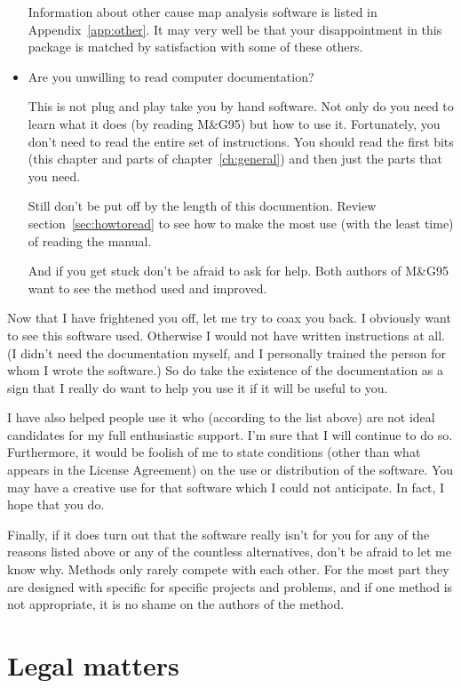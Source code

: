 \documentclass[%
	11pt,
        a4paper,
        twoside]{workrep}
\newcommand{\MG}{M\&G95\xspace}			%
\begin{document}
\begin{itemize}
  Information about other cause map analysis software is listed
  in Appendix~\ref{app:other}.  It may very well be that your
  disappointment in this package is matched by satisfaction with
  some of these others.

\item
  Are you unwilling to read computer documentation?

  This is not plug and play take you by hand software.  Not only do
  you need to learn what it does (by reading \MG) but how to use it.
  Fortunately, you don't need to read the entire set of instructions.
  You should read the first bits (this chapter and 
  parts of chapter~\ref{ch:general}) and then just the parts that you
  need.
 
  Still don't be put off by the length of this documention.
  Review section~\ref{sec:howtoread} to see how to make
  the most use (with the least time) of reading the manual.

  And if you get stuck don't be afraid to ask for help.  Both
  authors of \MG want to see the method used and improved.

\end{itemize}

Now that I have frightened you off, let me try to coax you back.
I obviously want to see this software used.  Otherwise I would not have
written instructions at all.  (I didn't need the documentation myself,
and I personally trained the person for whom I wrote the software.)
So do take the existence of the documentation as a sign that I
really do want to help you use it if it will be useful to you.

I have also helped people use it who (according to the list above)
are not ideal candidates for my full enthusiastic support.  I'm sure
that I will continue to do so.  Furthermore, it would be foolish of
me to state conditions (other than what appears in the License Agreement)
on the use or distribution of the software.  You may have a creative
use for that software which I could not anticipate.  In fact, I hope
that you do.

Finally, if it does turn out that the software really isn't for you for
any of the reasons listed above or any of the countless alternatives,
don't be afraid to let me know why.  Methods only rarely compete with
each other.  For the most part they are designed with specific for
specific projects and problems, and if one method is not appropriate,
it is no shame on the authors of the method.


\section{Legal matters}
\end{document}
